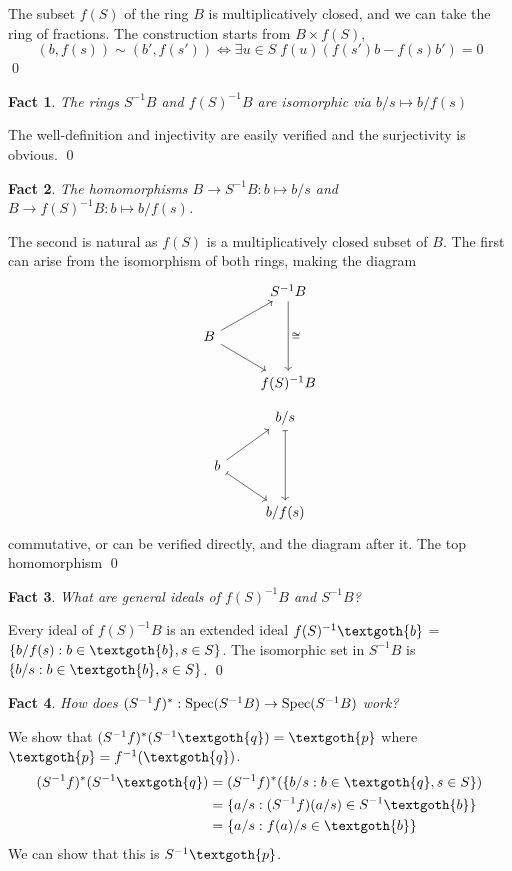 \documentclass{article}
\newtheorem{theorem}{Fact}[section]
\begin{document}
\noindent
The subset $f(S)$ of the ring $B$ is multiplicatively closed, and we can take the ring of fractions. The construction starts from $B \times f(S)$,
\[
(b, f(s)) \sim (b', f(s')) \iff \exists u \in S \; f(u)(f(s')b - f(s)b') = 0
\]
\qed

\bigskip
\begin{theorem}
The rings $S^{-1}B$ and $f(S)^{-1}B$ are isomorphic via $b/s \mapsto b/f(s)$
\end{theorem}

\noindent
The well-definition and injectivity are easily verified and the surjectivity is obvious.
\qed

\bigskip
\begin{theorem}
The homomorphisms $B \rightarrow S^{-1}B: b \mapsto b/s$ and $B \rightarrow f(S)^{-1}B: b \mapsto b/f(s)$.
\end{theorem}

\noindent
The second is natural as $f(S)$ is a multiplicatively closed subset of $B$. The first can arise from the isomorphism of both rings, making the diagram
\[
\begin{tikzcd}
  & S^{-1}B \arrow[dd, "\cong"] \\
  B \arrow[ur] \arrow[dr] \\
  & f(S)^{-1}B
\end{tikzcd}
\]
\[
\begin{tikzcd}
  & b/s \arrow[dd, mapsto] \\
  b \arrow[ur] \arrow[dr, mapsto] \\
  & b/f(s)
\end{tikzcd}
\]
commutative, or can be verified directly, and the diagram after it. The top homomorphism 
\qed

\bigskip
\begin{theorem}
What are general ideals of $f(S)^{-1}B$ and $S^{-1}B$?
\end{theorem}

\noindent
Every ideal of $f(S)^{-1}B$ is an extended ideal $f(S)^{-1}\textgoth{b}$ = $\{b/f(s): b\in \textgoth{b}, s \in S\}$. The isomorphic set in $S^{-1}B$ is $\{b/s: b\in \textgoth{b}, s \in S\}$.
\qed


\bigskip
\begin{theorem}
How does $(S^{-1}f)^*: \textnormal{Spec}(S^{-1}B) \rightarrow \text{Spec}(S^{-1}B)$ work? 
\end{theorem}

\noindent
We show that $(S^{-1}f)^*(S^{-1}\textgoth{q}) = \textgoth{p}$ where $\textgoth{p} = f^{-1}(\textgoth{q})$.
\begin{equation*}
\begin{split}
  (S^{-1}f)^*(S^{-1}\textgoth{q}) 
    & = (S^{-1}f)^*(\{ b/s: b \in \textgoth{q}, s \in S\}) \\
    & = \{ a/s: (S^{-1}f)(a/s) \in S^{-1}\textgoth{b} \} \\
    & = \{ a/s: f(a)/s \in \textgoth{b} \}
\end{split}
\end{equation*}
We can show that this is $S^{-1}\textgoth{p}$. \\
\end{document}

